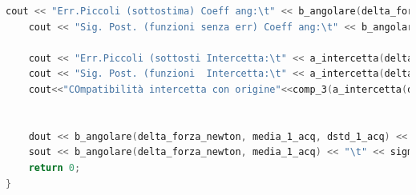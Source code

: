 \documentclass[a4paper,11pt,oneside]{article}
\begin{document}
\begin{lstlisting}[language=C++, label=lst:analisi_1ac, caption=analisi\_1ac]
    cout << "Err.Piccoli (sottostima) Coeff ang:\t" << b_angolare(delta_forza_newton, media_1_acq, dstd_1_acq) << " +/- " << sigma_b(delta_forza_newton, media_1_acq, dstd_1_acq) << endl;
    cout << "Sig. Post. (funzioni senza err) Coeff ang:\t" << b_angolare(delta_forza_newton, media_1_acq) << " +/- " << sigma_b(delta_forza_newton, media_1_acq) << endl;

    cout << "Err.Piccoli (sottosti Intercetta:\t" << a_intercetta(delta_forza_newton, media_1_acq, dstd_1_acq) << " +/- " << sigma_a(delta_forza_newton, media_1_acq, dstd_1_acq) << endl;
    cout << "Sig. Post. (funzioni  Intercetta:\t" << a_intercetta(delta_forza_newton, media_1_acq) << " +/- " << sigma_a(delta_forza_newton, media_1_acq) << endl;
    cout<<"COmpatibilità intercetta con origine"<<comp_3(a_intercetta(delta_forza_newton, media_1_acq), 0, sigma_a(delta_forza_newton, media_1_acq), sigma_y_posteriori(delta_forza_newton, media_1_acq))<<endl;

    
    dout << b_angolare(delta_forza_newton, media_1_acq, dstd_1_acq) << "\t" << sigma_b(delta_forza_newton, media_1_acq, dstd_1_acq) << "\t" << a_intercetta(delta_forza_newton, media_1_acq, dstd_1_acq) << "\t" << sigma_a(delta_forza_newton, media_1_acq, dstd_1_acq) << endl;
    sout << b_angolare(delta_forza_newton, media_1_acq) << "\t" << sigma_b(delta_forza_newton, media_1_acq) << "\t" << a_intercetta(delta_forza_newton, media_1_acq) << "\t" << sigma_a(delta_forza_newton, media_1_acq) << endl;
    return 0;
}
\end{lstlisting}
\end{document}
